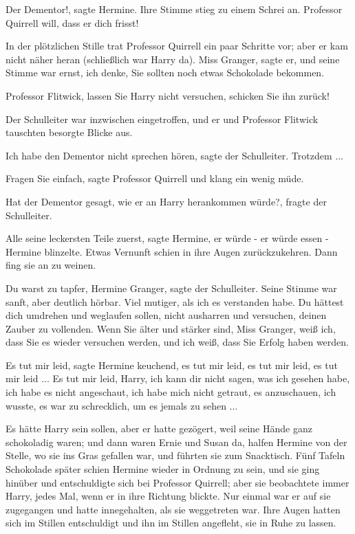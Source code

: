 \glqq{}Der Dementor!\grqq{}, sagte Hermine. Ihre Stimme stieg zu einem Schrei an.
\glqq{}Professor Quirrell will, dass er dich frisst!\grqq{}

In der plötzlichen Stille trat Professor Quirrell ein paar Schritte vor; aber er
kam nicht näher heran (schließlich war Harry da). \glqq{}Miss Granger\grqq{},
sagte er, und seine Stimme war ernst, \glqq{}ich denke, Sie sollten noch etwas
Schokolade bekommen.\grqq{}

\glqq{}Professor Flitwick, lassen Sie Harry nicht versuchen, schicken Sie ihn
zurück!\grqq{}

Der Schulleiter war inzwischen eingetroffen, und er und Professor Flitwick
tauschten besorgte Blicke aus.

\glqq{}Ich habe den Dementor nicht sprechen hören\grqq{}, sagte der Schulleiter.
\glqq{}Trotzdem ...\grqq{}

\glqq{}Fragen Sie einfach\grqq{}, sagte Professor Quirrell und klang ein wenig
müde.

\glqq{}Hat der Dementor gesagt, wie er an Harry herankommen würde?\grqq{}, fragte
der Schulleiter.

\glqq{}Alle seine leckersten Teile zuerst\grqq{}, sagte Hermine, \glqq{}er würde -
er würde essen -\grqq{} Hermine blinzelte. Etwas Vernunft schien in ihre Augen
zurückzukehren. Dann fing sie an zu weinen.

\glqq{}Du warst zu tapfer, Hermine Granger\grqq{}, sagte der Schulleiter. Seine
Stimme war sanft, aber deutlich hörbar. \glqq{}Viel mutiger, als ich es
verstanden habe. Du hättest dich umdrehen und weglaufen sollen, nicht ausharren
und versuchen, deinen Zauber zu vollenden. Wenn Sie älter und stärker sind, Miss
Granger, weiß ich, dass Sie es wieder versuchen werden, und ich weiß, dass Sie
Erfolg haben werden.\grqq{}

\glqq{}Es tut mir leid\grqq{}, sagte Hermine keuchend, \glqq{}es tut mir leid, es
tut mir leid, es tut mir leid ... Es tut mir leid, Harry, ich kann dir nicht
sagen, was ich gesehen habe, ich habe es nicht angeschaut, ich habe mich nicht
getraut, es anzuschauen, ich wusste, es war zu schrecklich, um es jemals zu
sehen ...\grqq{}

Es hätte Harry sein sollen, aber er hatte gezögert, weil seine Hände ganz
schokoladig waren; und dann waren Ernie und Susan da, halfen Hermine von der
Stelle, wo sie ins Gras gefallen war, und führten sie zum Snacktisch. Fünf
Tafeln Schokolade später schien Hermine wieder in Ordnung zu sein, und sie ging
hinüber und entschuldigte sich bei Professor Quirrell; aber sie beobachtete
immer Harry, jedes Mal, wenn er in ihre Richtung blickte. Nur einmal war er auf
sie zugegangen und hatte innegehalten, als sie weggetreten war. Ihre Augen
hatten sich im Stillen entschuldigt und ihn im Stillen angefleht, sie in Ruhe zu
lassen.

